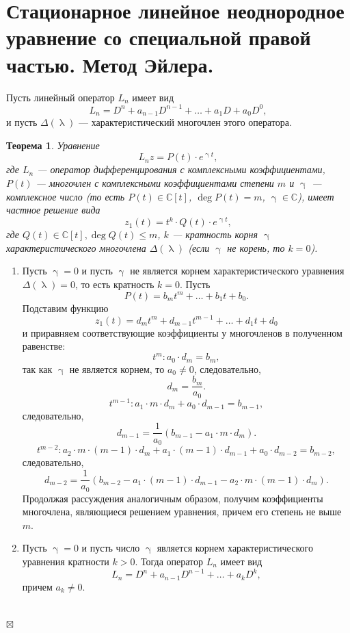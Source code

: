 \documentclass[a4paper, 12pt]{report}
\newenvironment{Proof} %
{\par\noindent{$\blacklozenge$}} %
{\hfill$\scriptstyle\boxtimes$}
\newcommand{\Cm}{\mathbb{C}}
\renewcommand{\lambda}{\uplambda}
\newcommand{\Ln}{L_n = D^n + a_{n-1}D^{n-1} + \ldots + a_1D + a_0D^0}
\begin{document}
\section{Стационарное линейное неоднородное уравнение со специальной правой частью. Метод Эйлера.}
Пусть линейный оператор $L_n$ имеет вид $$\Ln,$$ и пусть $\Delta(\lambda)$ --- характеристический многочлен этого оператора.
\newtheorem*{2_5_1}{Теорема}\begin{2_5_1}
	Уравнение $$L_nz = P(t)\cdot e^{\upgamma t},$$ где $L_n$ --- оператор дифференцирования с комплексными коэффициентами, $P(t)$ --- многочлен с комплексными коэффициентами степени $m$ и $\upgamma$ --- комплексное число (то есть $P(t)\in\Cm[t]$, $\deg P(t) = m$, $\upgamma \in \Cm$), имеет частное решение вида $$z_1(t) = t^k\cdot Q(t)\cdot e^{\upgamma t},$$ где $Q(t) \in \Cm[t], \deg Q(t) \leqslant m$, $k$ --- кратность корня $\upgamma$ характеристического многочлена $\Delta(\lambda)$ (если $\upgamma$ не корень, то $k=0$).
\end{2_5_1}\begin{Proof}
\begin{enumerate}
	\item Пусть $\upgamma = 0$ и пусть $\upgamma$ не является корнем характеристического уравнения $\Delta(\lambda) = 0$, то есть кратность $k = 0$. Пусть $$P(t) = b_mt^m + \ldots + b_1t + b_0.$$ Подставим функцию $$z_1(t) = d_mt^m + d_{m-1}t^{m-1} + \ldots + d_1t + d_0$$ и приравняем соответствующие коэффициенты у многочленов в полученном равенстве:
	$$t^m : a_0\cdot d_m = b_m,$$ так как $\upgamma$ не является корнем, то $a_0 \ne 0$, следовательно, $$d_m = \dfrac{b_m}{a_0}.$$
	$$t^{m-1} : a_1\cdot m\cdot d_m + a_0\cdot  d_{m-1}= b_{m-1},$$ следовательно, $$d_{m-1} = \dfrac{1}{a_0}(b_{m-1} - a_1\cdot m \cdot d_m).$$
	$$t^{m-2} : a_2\cdot m\cdot (m-1)\cdot d_m + a_1\cdot (m-1) \cdot d_{m-1} + a_0 \cdot d_{m-2} = b_{m-2},$$ следовательно, $$d_{m-2} = \dfrac{1}{a_0}(b_{m-2} - a_1\cdot (m-1)\cdot d_{m-1}- a_2\cdot m\cdot (m-1)\cdot d_m).$$
	Продолжая рассуждения аналогичным образом, получим коэффициенты многочлена, являющиеся решением уравнения, причем его степень не выше $m$.
	\item Пусть $\upgamma = 0$ и пусть число $\upgamma$ является корнем характеристического уравнения кратности $k > 0$. Тогда оператор $L_n$ имеет вид $$L_n = D^n + a_{n-1}D^{n-1} + \ldots + a_k D^{k},$$ причем $a_k \ne 0$.\\\\

\end{enumerate}
\end{Proof}
\end{document}
